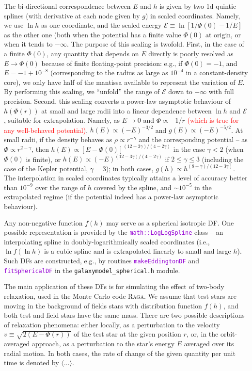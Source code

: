 \documentclass[12pt]{article}
\newcommand{\Raga} {\textsc{Raga}\xspace}
\newcommand{\ttt}[1]{\textcolor{darkviolet}{\texttt{#1}}}
\newcommand{\scE}{\mathscr E}
\begin{document}
The bi-directional correspondence between $E$ and $h$ is given by two 1d quintic splines (with derivative at each node given by $g$) in scaled coordinates. Namely, we use $\ln h$ as one coordinate, and the scaled energy $\scE \equiv \ln[1/\Phi(0) - 1/E]$ as the other one (both when the potential has a finite value $\Phi(0)$ at origin, or when it tends to $-\infty$. The purpose of this scaling is twofold. First, in the case of a finite $\Phi(0)$, any quantity that depends on $E$ directly is poorly resolved as $E\to \Phi(0)$ because of finite floating-point precision: e.g., if $\Phi(0)=-1$, and $E=-1+10^{-8}$ (corresponding to the radius as large as $10^{-4}$ in a constant-density core), we only have half of the mantissa available to represent the variation of $E$. By performing this scaling, we ``unfold'' the range of $\scE$ down to $-\infty$ with full precision. Second, this scaling converts a power-law asymptotic behaviour of $h(\Phi(r))$ at small and large radii into a linear dependence between $\ln h$ and $\scE$, suitable for extrapolation. Namely, as $E \to 0$ and $\Phi \propto -1/r$ \textcolor{red}{(which is true for any well-behaved potential)}, $h(E)\propto (-E)^{-3/2}$ and $g(E)\propto (-E)^{-5/2}$. At small radii, if the density behaves as $\rho \propto r^{-\gamma}$ and the corresponding potential -- as $\Phi \propto r^{2-\gamma}$, then $h(E) \propto [E-\Phi(0)]^{(12-3\gamma)/(4-2\gamma)}$ in the case $\gamma<2$ (when $\Phi(0)$ is finite), or $h(E) \propto (-E)^{(12-3\gamma)/(4-2\gamma)}$ if $2\le \gamma \le 3$ (including the case of the Kepler potential, $\gamma=3$); in both cases, $g(h) \propto h^{(8-\gamma)/(12-3\gamma)}$.
The interpolation in scaled coordinates typically attains a level of accuracy better than $10^{-9}$ over the range of $h$ covered by the spline, and $\sim 10^{-5}$ in the extrapolated regime (if the potential indeed has a power-law asymptotic behaviour).

Any non-negative function $f(h)$ may serve as a spherical isotropic DF. One possible representation is provided by the \ttt{math::LogLogSpline} class -- an interpolating spline in doubly-logarithmically scaled coordinates (i.e., $\ln f (\ln h)$ is a cubic spline and is extrapolated linearly to small and large $h$). Such DFs are constructed, e.g., by routines \ttt{makeEddingtonDF} and \ttt{fitSphericalDF} in the \texttt{galaxymodel_spherical.h} module.

The main application of these DFs is for simulating the effect of two-body relaxation, used in the Monte Carlo code \Raga \cite{Vasiliev2015}. We assume that test stars are moving in the background of fields stars with distribution function $f(h)$, and both test and field stars have the same mass. There are two possible descriptions of relaxation phenomena: either locally, as a perturbation to the velocity $v\equiv \sqrt{2(E-\Phi(r))}$ of the test star at the given position $r$, or, in the orbit-averaged approach, as a perturbation to the star's energy $E$ averaged over its radial motion.
In both cases, the rate of change of the given quantity per unit time is denoted by $\langle \dots \rangle$.
\end{document}
